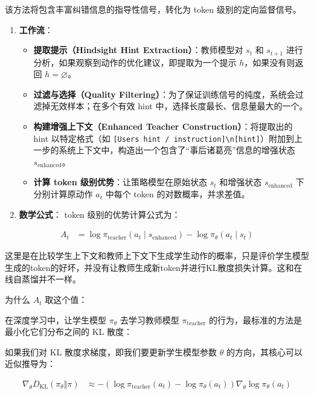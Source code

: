 该方法将包含丰富纠错信息的指导性信号，转化为 token 级别的定向监督信号。

\begin{enumerate}
\def\labelenumi{\arabic{enumi}.}
\tightlist
\item
  \textbf{工作流}：

  \begin{itemize}
  \tightlist
  \item
    \textbf{提取提示（Hindsight Hint Extraction）}：教师模型对 \(s_t\) 和 \(s_{t+1}\) 进行分析，如果观察到动作的优化建议，即提取为一个提示 \(h\)，如果没有则返回 \(h=\varnothing\)。
  \item
    \textbf{过滤与选择（Quality Filtering）}：为了保证训练信号的纯度，系统会过滤掉无效样本；在多个有效 hint 中，选择长度最长、信息量最大的一个。
  \item
    \textbf{构建增强上下文（Enhanced Teacher Construction）}：将提取出的 hint 以特定格式（如 \texttt{{[}User\textquotesingle{}s\ hint\ /\ instruction{]}\textbackslash{}n{[}hint{]}}）附加到上一步的系统上下文中，构造出一个包含了``事后诸葛亮''信息的增强状态 \(s_{\mathrm{enhanced}}\)。
  \item
    \textbf{计算 token 级别优势}：让策略模型在原始状态 \(s_t\) 和增强状态 \(s_{\mathrm{enhanced}}\) 下分别计算原动作 \(a_t\) 中每个 token 的对数概率，并求差值。
  \end{itemize}
\item
  \textbf{数学公式}：
  token 级别的优势计算公式为：
\end{enumerate}

\[
\begin{aligned}
A_t
&=
\log \pi_{\mathrm{teacher}}(a_t\mid s_{\mathrm{enhanced}})
-\log \pi_\theta(a_t\mid s_t)
\end{aligned}
\]

这里是在比较学生上下文和教师上下文下生成学生动作的概率，只是评价学生模型生成的token的好坏，并没有让教师生成新token并进行KL散度损失计算。这和在线自蒸馏并不一样。

为什么 \(A_t\) 取这个值：

在深度学习中，让学生模型 \(\pi_\theta\) 去学习教师模型 \(\pi_{\mathrm{teacher}}\) 的行为，最标准的方法是最小化它们分布之间的 KL 散度：

如果我们对 KL 散度求梯度，即我们要更新学生模型参数 \(\theta\) 的方向，其核心可以近似推导为：

\[
\begin{aligned}
\nabla_\theta D_{\mathrm{KL}}(\pi_\theta\Vert\pi)
&\approx
-\left(
\log \pi_{\mathrm{teacher}}(a_t)
-\log \pi_\theta(a_t)
\right)
\nabla_\theta \log \pi_\theta(a_t)
\end{aligned}
\]

